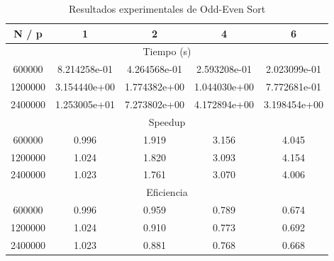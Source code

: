 \begin{table}[htbp]
\centering
\caption{Resultados experimentales de Odd-Even Sort}
\label{tab:oddeven}
\begin{tabular}{ccccc}
\toprule
N / p & 1 & 2 & 4 & 6 \\
\midrule
\multicolumn{5}{c}{Tiempo (s)} \\
\midrule
600000 & 8.214258e-01 & 4.264568e-01 & 2.593208e-01 & 2.023099e-01 \\
1200000 & 3.154440e+00 & 1.774382e+00 & 1.044030e+00 & 7.772681e-01 \\
2400000 & 1.253005e+01 & 7.273802e+00 & 4.172894e+00 & 3.198454e+00 \\
\midrule
\multicolumn{5}{c}{Speedup} \\
\midrule
600000 & 0.996 & 1.919 & 3.156 & 4.045 \\
1200000 & 1.024 & 1.820 & 3.093 & 4.154 \\
2400000 & 1.023 & 1.761 & 3.070 & 4.006 \\
\midrule
\multicolumn{5}{c}{Eficiencia} \\
\midrule
600000 & 0.996 & 0.959 & 0.789 & 0.674 \\
1200000 & 1.024 & 0.910 & 0.773 & 0.692 \\
2400000 & 1.023 & 0.881 & 0.768 & 0.668 \\
\bottomrule
\end{tabular}
\end{table}
